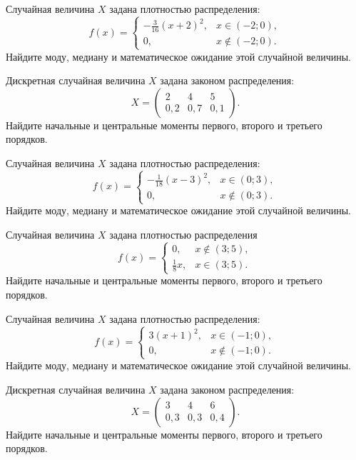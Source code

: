 \vfill

\newpage\setcounter{zad}{0}

\z Случайная величина $X$ задана плотностью распределения: $$f(x) = \begin{cases} -\frac{3}{16}(x+2)^2, & x \in (-2; 0), \\ 0, & x \not\in (-2; 0). \end{cases}$$ Найдите моду, медиану и математическое ожидание этой случайной величины.


\vfill

\z Дискретная случайная величина $X$ задана законом распределения: $$ X = \left(\begin{array}{rrr}2 & 4 & 5\\0{,}2 & 0{,}7 & 0{,}1\end{array}\right).$$ Найдите начальные и центральные моменты первого, второго и третьего порядков.
 

\vfill

\newpage\setcounter{zad}{0}

\z Случайная величина $X$ задана плотностью распределения: $$f(x) = \begin{cases} -\frac{1}{18}(x-3)^2, & x \in (0; 3), \\ 0, & x \not\in (0; 3). \end{cases}$$ Найдите моду, медиану и математическое ожидание этой случайной величины.


\vfill

\z Случайная величина $X$ задана плотностью распределения $$f(x) = \begin{cases}0, & x\not\in(3; 5), \\ \frac{1}{8}x, & x\in(3; 5).\end{cases}$$ Найдите начальные и центральные моменты первого, второго и третьего порядков.
 

\vfill

\newpage\setcounter{zad}{0}

\z Случайная величина $X$ задана плотностью распределения: $$f(x) = \begin{cases} 3(x+1)^2, & x \in (-1; 0), \\ 0, & x \not\in (-1; 0). \end{cases}$$ Найдите моду, медиану и математическое ожидание этой случайной величины.


\vfill

\z Дискретная случайная величина $X$ задана законом распределения: $$ X = \left(\begin{array}{rrr}3 & 4 & 6\\0{,}3 & 0{,}3 & 0{,}4\end{array}\right).$$ Найдите начальные и центральные моменты первого, второго и третьего порядков.
 

